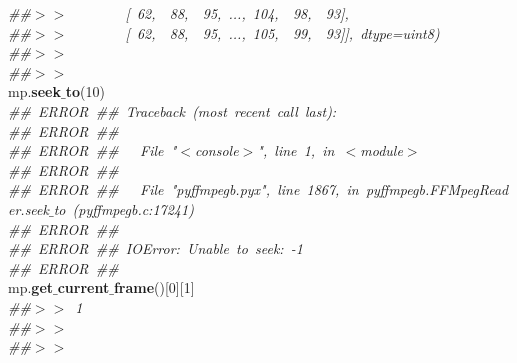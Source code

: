 \mbox{}\textit{\#\#$>$$>$\ \ \ \ \ \ \ \ [\ 62,\ \ 88,\ \ 95,\ ...,\ 104,\ \ 98,\ \ 93],} \\
\mbox{}\textit{\#\#$>$$>$\ \ \ \ \ \ \ \ [\ 62,\ \ 88,\ \ 95,\ ...,\ 105,\ \ 99,\ \ 93]],\ dtype=uint8)} \\
\mbox{}\textit{\#\#$>$$>$\ } \\
\mbox{}\textit{\#\#$>$$>$\ } \\
\mbox{}mp.\textbf{seek$\_$to}(10) \\
\mbox{}\textit{\#\#\ ERROR\ \#\#\ Traceback\ (most\ recent\ call\ last):} \\
\mbox{}\textit{\#\#\ ERROR\ \#\#\ } \\
\mbox{}\textit{\#\#\ ERROR\ \#\#\ \ \ File\ "{}$<$console$>$"{},\ line\ 1,\ in\ $<$module$>$} \\
\mbox{}\textit{\#\#\ ERROR\ \#\#\ } \\
\mbox{}\textit{\#\#\ ERROR\ \#\#\ \ \ File\ "{}pyffmpegb.pyx"{},\ line\ 1867,\ in\ pyffmpegb.FFMpegReader.seek$\_$to\ (pyffmpegb.c:17241)} \\
\mbox{}\textit{\#\#\ ERROR\ \#\#\ } \\
\mbox{}\textit{\#\#\ ERROR\ \#\#\ IOError:\ Unable\ to\ seek:\ -1} \\
\mbox{}\textit{\#\#\ ERROR\ \#\#\ } \\
\mbox{}mp.\textbf{get$\_$current$\_$frame}()[0][1] \\
\mbox{}\textit{\#\#$>$$>$\ 1} \\
\mbox{}\textit{\#\#$>$$>$\ } \\
\mbox{}\textit{\#\#$>$$>$\ } \\
\mbox{} \\
\mbox{}